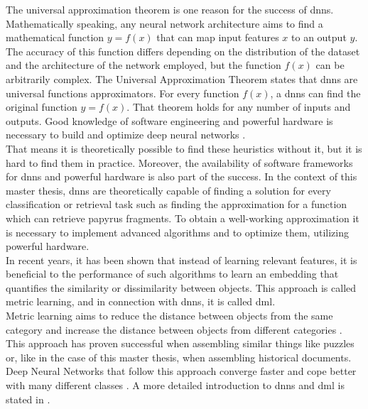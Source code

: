 \noindent The universal approximation theorem is one reason for the success of \acp{dnn}. Mathematically speaking, any neural network architecture aims to find a mathematical function \(y = f(x)\) that can map input features \(x\) to an output \(y\). The accuracy of this function differs depending on the distribution of the dataset and the architecture of the network employed, but the function \(f(x)\) can be arbitrarily complex. The Universal Approximation Theorem states that \acp{dnn} are universal functions approximators. For every function \(f(x)\), a \acp{dnn} can find the original function \(y = f(x)\). That theorem holds for any number of inputs and outputs. Good knowledge of software engineering and powerful hardware is necessary to build and optimize deep neural networks \cite{Hornik89}.\\

\noindent That means it is theoretically possible to find these heuristics without it, but it is hard to find them in practice. Moreover, the availability of software frameworks for \acp{dnn} and powerful hardware is also part of the success. In the context of this master thesis, \acp{dnn} are theoretically capable of finding a solution for every classification or retrieval task such as finding the approximation for a function which can retrieve papyrus fragments. To obtain a well-working approximation it is necessary to implement advanced algorithms and to optimize them, utilizing powerful hardware.\\

\noindent In recent years, it has been shown that instead of learning relevant features, it is beneficial to the performance of such algorithms to learn an embedding that quantifies the similarity or dissimilarity between objects. This approach is called metric learning, and in connection with \acp{dnn}, it is called \ac{dml}.\\

Metric learning aims to reduce the distance between objects from the same category and increase the distance between objects from different categories \cite{KAYA19}. This approach has proven successful when assembling similar things like puzzles or, like in the case of this master thesis, when assembling historical documents. Deep Neural Networks that follow this approach converge faster and cope better with many different classes \cite{Lais19, Ostertag21, Pirrone21}. A more detailed introduction to \acp{dnn} and \ac{dml} is stated in .\\

